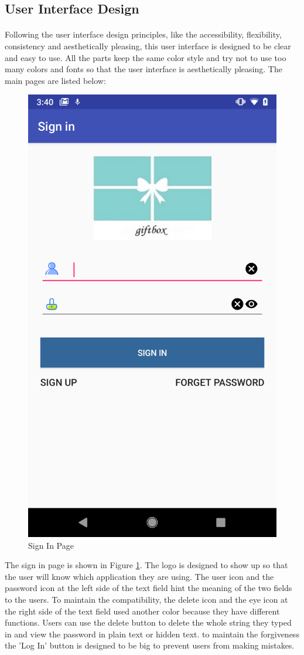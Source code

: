 \subsection{User Interface Design}
\paragraph{}Following the user interface design principles, like the accessibility, flexibility, consistency and aesthetically pleasing, this user interface is designed to be clear and easy to use. All the parts keep the same color style and try not to use too many colors and fonts so that the user interface is aesthetically pleasing. The main pages are listed below:
\begin{figure}[htb]
\centering
\includegraphics[width=.5\textwidth]{section03/assets/SignIn.png}
\caption[Short Caption 2]{\label{SignInUI}Sign In Page}
\end{figure}
\par The sign in page is shown in Figure \ref{SignInUI}. The logo is designed to show up so that the user will know which application they are using. The user icon and the password icon at the left side of the text field hint the meaning of the two fields to the users. To maintain the compatibility, the delete icon and the eye icon at the right side of the text field used another color because they have different functions. Users can use the delete button to delete the whole string they typed in and view the password in plain text or hidden text. to maintain the forgiveness the 'Log In' button is designed to be big to prevent users from making mistakes. 

